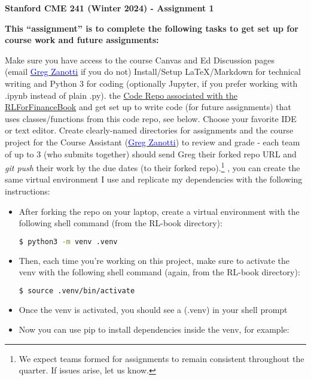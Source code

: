 \documentclass[12pt]{exam}
\begin{document}
\begin{center}
{\large {\bf Stanford CME 241 (Winter 2024) - Assignment 1}}
\end{center}
 
{\large{\bf This ``assignment'' is to complete the following tasks to get set up for course work and future assignments:}}
\begin{questions}
\question Make sure you have access to the course Canvas and Ed Discussion pages \\ (email \href{mailto:gzanotti@stanford.edu}{\underline{\textcolor{blue}{Greg Zanotti}}} if you do not)
\question Install/Setup LaTeX/Markdown for technical writing and Python 3 for coding (optionally Jupyter, if you prefer working with .ipynb instead of plain .py).
 the \href{https://github.com/TikhonJelvis/RL-book}{Code Repo associated with the RLForFinanceBook} and get set up to write code (for future assignments) that uses classes/functions from this code repo, see below. Choose your favorite IDE or text editor.
\question Create clearly-named directories for assignments and the course project for the Course Assistant (\href{mailto:gzanotti@stanford.edu}{\underline{\textcolor{blue}{Greg Zanotti}}}) to review and grade - each team of up to 3 (who submits together) should send Greg their forked repo URL and {\em git push} their work by the due dates (to their forked repo).\footnote{We expect teams formed for assignments to remain consistent throughout the quarter. If issues arise, let us know.}
, you can create the same virtual environment I use and replicate my dependencies with the following instructions:
\begin{itemize}
\item After forking the repo on your laptop, create a virtual environment with the following shell command (from the RL-book directory):
\begin{lstlisting}[language=bash]
$ python3 -m venv .venv
\end{lstlisting}
\item Then, each time you're working on this project, make sure to activate the venv with the following shell command (again, from the RL-book directory):
\begin{lstlisting}[language=bash]
$ source .venv/bin/activate
\end{lstlisting}
\item Once the venv is activated, you should see a (.venv) in your shell prompt
\item Now you can use pip to install dependencies inside the venv, for example:

\end{itemize}
\end{questions}
\end{document}

